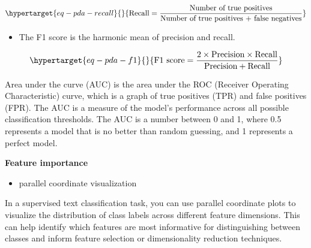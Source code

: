 \documentclass[
  letterpaper,
]{latex/krantz}
\providecommand{\tightlist}{%
  \setlength{\itemsep}{0pt}\setlength{\parskip}{0pt}}\usepackage{longtable,booktabs,array}
\begin{document}
\begin{equation}\protect\hypertarget{eq-pda-recall}{}{
\text{Recall} = \frac{\text{Number of true positives}}{\text{Number of true positives + false negatives}}
}\label{eq-pda-recall}\end{equation}

\begin{itemize}
\tightlist
\item
  The F1 score is the harmonic mean of precision and recall.
\end{itemize}

\begin{equation}\protect\hypertarget{eq-pda-f1}{}{
\text{F1 score} = \frac{2 \times \text{Precision} \times \text{Recall}}{\text{Precision} + \text{Recall}}
}\label{eq-pda-f1}\end{equation}

Area under the curve (AUC) is the area under the ROC (Receiver Operating
Characteristic) curve, which is a graph of true positives (TPR) and
false positives (FPR). The AUC is a measure of the model's performance
across all possible classification thresholds. The AUC is a number
between 0 and 1, where 0.5 represents a model that is no better than
random guessing, and 1 represents a perfect model.

\textbf{Feature importance}

\begin{itemize}
\tightlist
\item
  parallel coordinate visualization
\end{itemize}

In a supervised text classification task, you can use parallel
coordinate plots to visualize the distribution of class labels across
different feature dimensions. This can help identify which features are
most informative for distinguishing between classes and inform feature
selection or dimensionality reduction techniques.
\end{document}
